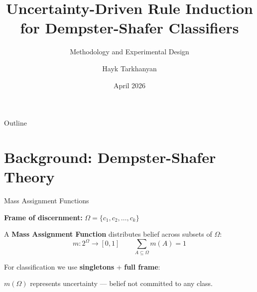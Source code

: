 \documentclass[aspectratio=169,12pt]{beamer}
\title[DSGD++ Rule Induction]{Uncertainty-Driven Rule Induction\\for Dempster-Shafer Classifiers}
\subtitle{Methodology and Experimental Design}
\author[H.~Tarkhanyan]{Hayk Tarkhanyan}
\date{April 2026}
\begin{document}
\begin{frame}
\titlepage
\end{frame}

\begin{frame}{Outline}
\tableofcontents
\end{frame}


\section{Background: Dempster-Shafer Theory}

\begin{frame}{Mass Assignment Functions}

\textbf{Frame of discernment:} $\Omega = \{c_1, c_2, \ldots, c_k\}$

\vspace{1em}
A \textbf{Mass Assignment Function} distributes belief across subsets of $\Omega$:
$$m: 2^\Omega \rightarrow [0,1] \qquad \sum_{A \subseteq \Omega} m(A) = 1$$

\vspace{1em}
For classification we use \textbf{singletons} + \textbf{full frame}:

\vspace{0.5em}
\begin{center}
\end{center}

\vspace{1em}
$m(\Omega)$ represents \textcolor{dstred}{uncertainty} --- belief not committed to any class.

\end{frame}
\end{document}
